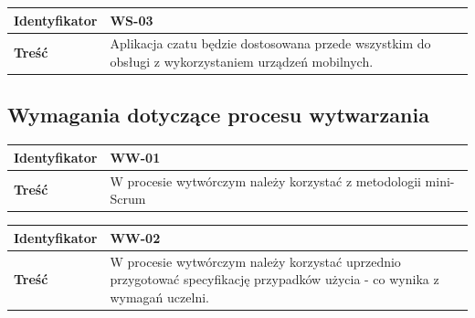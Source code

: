 \vspace{1em}

\begin{tabular}{ | l | l | }
	\hline
		\textbf{Identyfikator} &
	WS-03
		\\

	\hline
		\textbf{Treść} & \parbox[t]{13cm}{
			Aplikacja czatu będzie dostosowana przede wszystkim
			do obsługi z wykorzystaniem urządzeń mobilnych.
		}\\

	\hline
\end{tabular}

\subsection{Wymagania dotyczące procesu wytwarzania}

\leavevmode\hbox{}

\begin{tabular}{ | l | l | }
	\hline
		\textbf{Identyfikator} &
	WW-01
		\\

	\hline
		\textbf{Treść} & \parbox[t]{13cm}{
			W procesie wytwórczym należy korzystać z metodologii
			mini-Scrum
		}\\

	\hline
\end{tabular}

\vspace{1em}

\begin{tabular}{ | l | l | }
	\hline
		\textbf{Identyfikator} &
	WW-02
		\\

	\hline
		\textbf{Treść} & \parbox[t]{13cm}{
			W procesie wytwórczym należy korzystać uprzednio przygotować specyfikację przypadków użycia - co wynika z wymagań uczelni.
		}\\

	\hline
\end{tabular}
